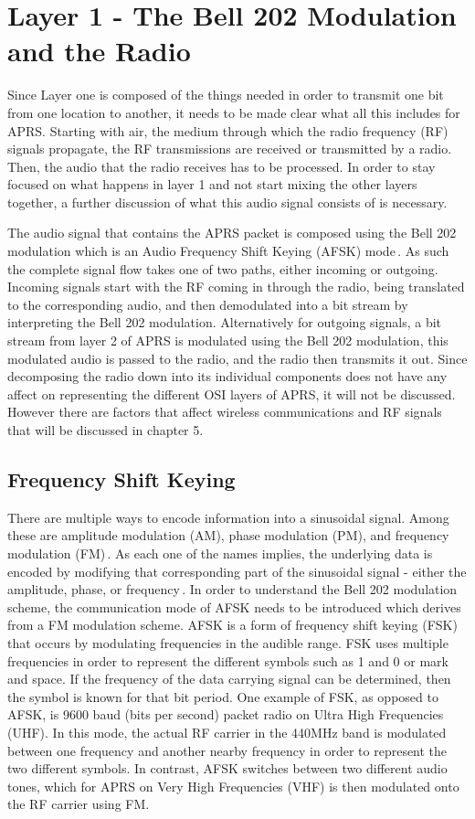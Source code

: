 \section{Layer 1 - The Bell 202 Modulation and the Radio}
Since Layer one is composed of the things needed in order to transmit one bit from one location to another, it needs to be made clear what all this includes for APRS. Starting with air, the medium through which the radio frequency (RF) signals propagate, the RF transmissions are received or transmitted by a radio. Then, the audio that the radio receives has to be processed. In order to stay focused on what happens in layer 1 and not start mixing the other layers together, a further discussion of what this audio signal consists of is necessary.

The audio signal that contains the APRS packet is composed using the Bell 202 modulation which is an Audio Frequency Shift Keying (AFSK) mode\,\cite{ITUV23,Goleniewski2006}. As such the complete signal flow takes one of two paths, either incoming or outgoing. Incoming signals start with the RF coming in through the radio, being translated to the corresponding audio, and then demodulated into a bit stream by interpreting the Bell 202 modulation. Alternatively for outgoing signals, a bit stream from layer 2 of APRS is modulated using the Bell 202 modulation, this modulated audio is passed to the radio, and the radio then transmits it out. Since decomposing the radio down into its individual components does not have any affect on representing the different OSI layers of APRS, it will not be discussed. However there are factors that affect wireless communications and RF signals that will be discussed in chapter 5.

\subsection{Frequency Shift Keying}
There are multiple ways to encode information into a sinusoidal signal. Among these are amplitude modulation (AM), phase modulation (PM), and frequency modulation (FM)\,\cite{Goleniewski2006}. As each one of the names implies, the underlying data is encoded by modifying that corresponding part of the sinusoidal signal - either the amplitude, phase, or frequency\,\cite{Instruments2014}. In order to understand the Bell 202 modulation scheme, the communication mode of AFSK needs to be introduced which derives from a FM modulation scheme. AFSK is a form of frequency shift keying (FSK) that occurs by modulating frequencies in the audible range. FSK uses multiple frequencies in order to represent the different symbols such as 1 and 0 or mark and space. If the frequency of the data carrying signal can be determined, then the symbol is known for that bit period. One example of FSK, as opposed to AFSK, is 9600 baud (bits per second) packet radio on Ultra High Frequencies (UHF). In this mode, the actual RF carrier in the 440MHz band is modulated between one frequency and another nearby frequency in order to represent the two different symbols. In contrast, AFSK switches between two different audio tones, which for APRS on Very High Frequencies (VHF) is then modulated onto the RF carrier using FM.


